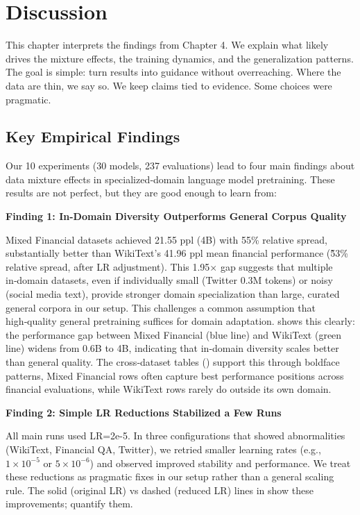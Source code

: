 \chapter{Discussion}

This chapter interprets the findings from Chapter 4. We explain what likely drives the mixture effects, the training dynamics, and the generalization patterns. The goal is simple: turn results into guidance without overreaching. Where the data are thin, we say so. We keep claims tied to evidence. Some choices were pragmatic.

\section{Key Empirical Findings}

Our 10 experiments (30 models, 237 evaluations) lead to four main findings about data mixture effects in specialized‑domain language model pretraining. These results are not perfect, but they are good enough to learn from:

\textbf{Finding 1: In-Domain Diversity Outperforms General Corpus Quality}

Mixed Financial datasets achieved 21.55 ppl (4B) with 55\% relative spread, substantially better than WikiText's 41.96 ppl mean financial performance (\~53\% relative spread, after LR adjustment). This 1.95$\times$ gap suggests that multiple in‑domain datasets, even if individually small (Twitter 0.3M tokens) or noisy (social media text), provide stronger domain specialization than large, curated general corpora in our setup. This challenges a common assumption that high‑quality general pretraining suffices for domain adaptation.  shows this clearly: the performance gap between Mixed Financial (blue line) and WikiText (green line) widens from 0.6B to 4B, indicating that in‑domain diversity scales better than general quality. The cross‑dataset tables () support this through boldface patterns, Mixed Financial rows often capture best performance positions across financial evaluations, while WikiText rows rarely do outside its own domain.

\textbf{Finding 2: Simple LR Reductions Stabilized a Few Runs}

All main runs used LR=2e-5. In three configurations that showed abnormalities (WikiText, Financial QA, Twitter), we retried smaller learning rates (e.g., $1\times10^{-5}$ or $5\times10^{-6}$) and observed improved stability and performance. We treat these reductions as pragmatic fixes in our setup rather than a general scaling rule. The solid (original LR) vs dashed (reduced LR) lines in  show these improvements;  quantify them.

